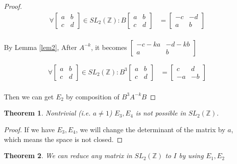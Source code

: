 \documentclass[11pt]{article}
\newcommand{\Z}{\mathbb{Z}}
\newtheorem{theorem}{Theorem}
\begin{document}
\begin{proof}
	\begin{align*}
		\forall \begin{bmatrix} 
			a & b\\
			c & d 
	\end{bmatrix} \in SL_2(\Z): B \begin{bmatrix} 
				a & b\\
				c & d 
		\end{bmatrix} & = \begin{bmatrix} 
			-c &-d\\
			a & b 
	\end{bmatrix} \\
	\end{align*}

	By Lemma \ref{lem2}, After \(A^{-k}\), it becomes \(\begin{bmatrix} 
		-c-ka &-d-kb\\
		a & b 
\end{bmatrix}\)

	\begin{align*}
		\forall \begin{bmatrix} 
			a & b\\
			c & d 
	\end{bmatrix} \in SL_2(\Z): B^3 \begin{bmatrix} 
				a & b\\
				c & d 
		\end{bmatrix} & = \begin{bmatrix} 
			c & d\\
			-a & -b
	\end{bmatrix} \\
	\end{align*}

	Then we can get \(E_2\) by composition of \(B^3A^{-k}B\)


\end{proof}

\begin{theorem}
	Nontrivial (i.e. \(a\neq 1\)) \(E_3, E_4\) is not possible in \(SL_2(\Z)\).
\end{theorem}
\begin{proof}
	If we have \(E_3, E_4\), we will change the determinant of the matrix by \(a\),
	which means the space is not closed.
	
\end{proof}


\begin{theorem}
	We can reduce any matrix in \(SL_2(\Z)\) to \(I\) by using \(E_1, E_2\)
\end{theorem}
\end{document}
